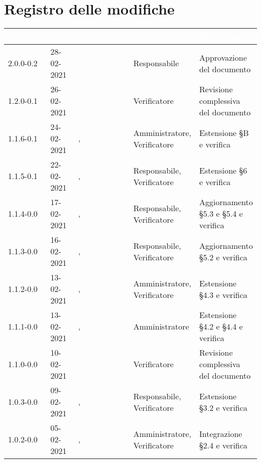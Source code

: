 \section*{Registro delle modifiche}
{
\setcounter{table}{-1}
{
\renewcommand{\arraystretch}{1.5}
\centering
\begin{longtable}{C{1.7cm} | C{2.2cm} | C{3.2cm} | C{3cm} | C{4.8cm}}
\textcolor{white}{\textbf{Versione}}&
\textcolor{white}{\textbf{Data}}&
\textcolor{white}{\textbf{Nominativo}}&
\textcolor{white}{\textbf{Ruolo}}&
\textcolor{white}{\textbf{Descrizione}}\\	
\endhead

2.0.0-0.2 & 28-02-2021 & \ZM{} & Responsabile & Approvazione del documento\\

1.2.0-0.1 & 26-02-2021 & \SP{} & Verificatore & Revisione complessiva del documento\\

1.1.6-0.1 & 24-02-2021 & \SG{}, \SP{} & Amministratore, Verificatore & Estensione \S B e verifica\\

1.1.5-0.1 & 22-02-2021 & \ZM{}, \SP{} & Responsabile, Verificatore & Estensione \S 6 e verifica\\

1.1.4-0.0 & 17-02-2021 & \PA{}, \ZM{} & Responsabile, Verificatore & Aggiornamento \S 5.3 e \S 5.4 e verifica\\

1.1.3-0.0 & 16-02-2021 & \PA{}, \ZM{} & Responsabile, Verificatore & Aggiornamento \S 5.2 e verifica\\

1.1.2-0.0 & 13-02-2021 & \BM{}, \ZM{} & Amministratore, Verificatore & Estensione \S 4.3 e verifica\\

1.1.1-0.0 & 13-02-2021 & \SG{}, \ZM{} & Amministratore & Estensione \S 4.2 e \S 4.4 e verifica\\

1.1.0-0.0 & 10-02-2021 & \ZM{} & Verificatore & Revisione complessiva del documento\\

1.0.3-0.0 & 09-02-2021 & \PA{}, \SP{} & Responsabile, Verificatore & Estensione \S 3.2 e verifica\\

1.0.2-0.0 & 05-02-2021& \BM{}, \SP{} & Amministratore, Verificatore & Integrazione \S 2.4 e verifica\\


\end{longtable}}}
